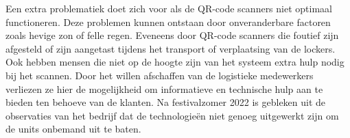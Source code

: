 Een extra problematiek doet zich voor als de QR-code scanners niet optimaal functioneren. Deze problemen kunnen ontstaan door onveranderbare factoren zoals hevige zon of felle regen. Eveneens door QR-code scanners die foutief zijn afgesteld of zijn aangetast tijdens het transport of verplaatsing van de lockers. Ook hebben mensen die niet op de hoogte zijn van het systeem extra hulp nodig bij het scannen. Door het willen afschaffen van de logistieke medewerkers verliezen ze hier de mogelijkheid om informatieve en technische hulp aan te bieden ten behoeve van de klanten. Na festivalzomer 2022 is gebleken uit de observaties van het bedrijf dat de technologieën niet genoeg uitgewerkt zijn om de units onbemand uit te baten.

\newpage
\section{}%
\label{sec:onderzoeksvraag}

\begin{comment}
    Wees zo concreet mogelijk bij het formuleren van je onderzoeksvraag. Een onderzoeksvraag is trouwens iets waar nog niemand op dit moment een antwoord heeft (voor zover je kan nagaan). Het opzoeken van bestaande informatie (bv. ``welke tools bestaan er voor deze toepassing?'') is dus geen onderzoeksvraag. Je kan de onderzoeksvraag verder specifiëren in deelvragen. Bv.~als je onderzoek gaat over performantiemetingen, dan  
\end{comment}

\section{}%
\label{sec:onderzoeksdoelstelling}
\begin{comment}
    Wat is het beoogde resultaat van je bachelorproef? Wat zijn de criteria voor succes? Beschrijf die zo concreet mogelijk. Gaat het bv.\ om een proof-of-concept, een prototype, een verslag met aanbevelingen, een vergelijkende studie, enz.
\end{comment}


\section{}%
\label{sec:opzet-bachelorproef}

